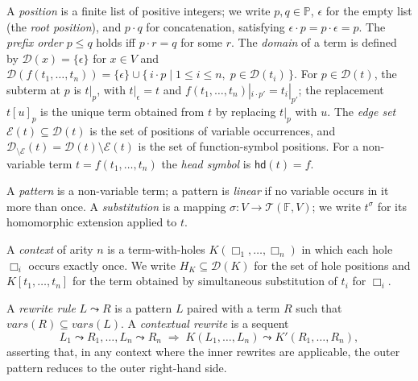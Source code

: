 \documentclass[11pt]{article}
\theoremstyle{plain}
\theoremstyle{definition}
\theoremstyle{remark}
\newcommand{\rew}{\leadsto}
\newcommand{\Terms}{\mathcal{T}}
\newcommand{\Pos}{\mathbb{P}}
\newcommand{\hd}{\mathsf{hd}}
\newcommand{\dom}{\mathcal{D}}
\newcommand{\edges}{\mathcal{E}}
\begin{document}
A \emph{position} is a finite list of positive integers; we write
$p, q \in \Pos$, $\epsilon$ for the empty list (the \emph{root
position}), and $p \cdot q$ for concatenation, satisfying
$\epsilon \cdot p = p \cdot \epsilon = p$. The \emph{prefix order}
$p \le q$ holds iff $p \cdot r = q$ for some $r$. The \emph{domain} of a
term is defined by $\dom(x) = \{\epsilon\}$ for $x \in V$ and
$\dom(f(t_{1}, \ldots, t_{n})) = \{\epsilon\} \cup
\{\, i \cdot p \mid 1 \le i \le n,\; p \in \dom(t_{i}) \,\}$. For
$p \in \dom(t)$, the subterm at $p$ is $t|_{p}$, with
$t|_{\epsilon} = t$ and $f(t_{1}, \ldots, t_{n})|_{i \cdot p'} =
t_{i}|_{p'}$; the replacement $t[u]_{p}$ is the unique term obtained
from $t$ by replacing $t|_{p}$ with $u$. The \emph{edge set}
$\edges(t) \subseteq \dom(t)$ is the set of positions of variable
occurrences, and $\dom_{\setminus\edges}(t) = \dom(t) \setminus
\edges(t)$ is the set of function-symbol positions. For a non-variable
term $t = f(t_{1}, \ldots, t_{n})$ the \emph{head symbol} is
$\hd(t) = f$.

A \emph{pattern} is a non-variable term; a pattern is \emph{linear} if
no variable occurs in it more than once. A \emph{substitution} is a
mapping $\sigma : V \to \Terms(\mathbb{F}, V)$; we write $t^{\sigma}$
for its homomorphic extension applied to $t$.

A \emph{context} of arity $n$ is a term-with-holes
$K(\Box_{1}, \ldots, \Box_{n})$ in which each hole $\Box_{i}$ occurs
exactly once. We write $H_{K} \subseteq \dom(K)$ for the set of hole
positions and $K[t_{1}, \ldots, t_{n}]$ for the term obtained by
simultaneous substitution of $t_{i}$ for $\Box_{i}$.

A \emph{rewrite rule} $L \rew R$ is a pattern $L$ paired with a term $R$
such that $\mathit{vars}(R) \subseteq \mathit{vars}(L)$. A
\emph{contextual rewrite} is a sequent
\[
  L_{1} \rew R_{1}, \ldots, L_{n} \rew R_{n}
  \;\Rightarrow\;
  K(L_{1}, \ldots, L_{n}) \rew K'(R_{1}, \ldots, R_{n}),
\]
asserting that, in any context where the inner rewrites are
applicable, the outer pattern reduces to the outer right-hand side.
\end{document}
